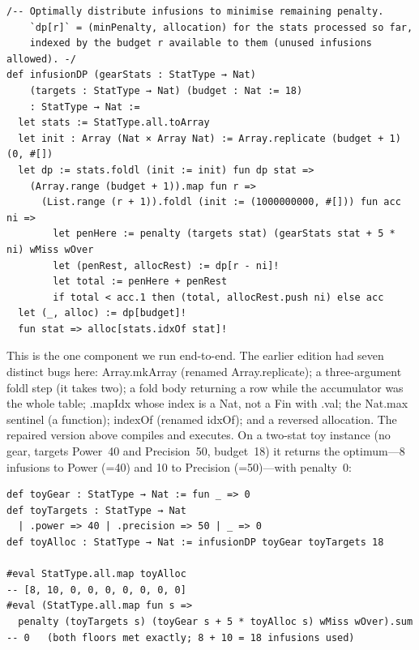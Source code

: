 \documentclass[11pt, a4paper, oneside]{book}
\newcommand{\li}[1]{{\ttfamily\small\color{deepblue}#1}}
\begin{document}
\begin{leanbox}[title={Lean 4 --- Infusion DP (runnable core Lean)}]
\begin{verbatim}
/-- Optimally distribute infusions to minimise remaining penalty.
    `dp[r]` = (minPenalty, allocation) for the stats processed so far,
    indexed by the budget r available to them (unused infusions allowed). -/
def infusionDP (gearStats : StatType → Nat)
    (targets : StatType → Nat) (budget : Nat := 18)
    : StatType → Nat :=
  let stats := StatType.all.toArray
  let init : Array (Nat × Array Nat) := Array.replicate (budget + 1) (0, #[])
  let dp := stats.foldl (init := init) fun dp stat =>
    (Array.range (budget + 1)).map fun r =>
      (List.range (r + 1)).foldl (init := (1000000000, #[])) fun acc ni =>
        let penHere := penalty (targets stat) (gearStats stat + 5 * ni) wMiss wOver
        let (penRest, allocRest) := dp[r - ni]!
        let total := penHere + penRest
        if total < acc.1 then (total, allocRest.push ni) else acc
  let (_, alloc) := dp[budget]!
  fun stat => alloc[stats.idxOf stat]!
\end{verbatim}
\end{leanbox}

This is the one component we run end-to-end.  The earlier edition had seven
distinct bugs here: \li{Array.mkArray} (renamed \li{Array.replicate}); a
three-argument \li{foldl} step (it takes two); a fold body returning a row while
the accumulator was the whole table; \li{.mapIdx} whose index is a \li{Nat}, not
a \li{Fin} with \li{.val}; the \li{Nat.max} sentinel (a function); \li{indexOf}
(renamed \li{idxOf}); and a reversed allocation.  The repaired version above
compiles and executes.  On a two-stat toy instance (no gear, targets
Power~40 and Precision~50, budget~18) it returns the optimum---8 infusions to
Power (=40) and 10 to Precision (=50)---with penalty~0:

\begin{leanbox}[title={Lean 4 --- Running the DP}]
\begin{verbatim}
def toyGear : StatType → Nat := fun _ => 0
def toyTargets : StatType → Nat
  | .power => 40 | .precision => 50 | _ => 0
def toyAlloc : StatType → Nat := infusionDP toyGear toyTargets 18

#eval StatType.all.map toyAlloc
-- [8, 10, 0, 0, 0, 0, 0, 0, 0]
#eval (StatType.all.map fun s =>
  penalty (toyTargets s) (toyGear s + 5 * toyAlloc s) wMiss wOver).sum
-- 0   (both floors met exactly; 8 + 10 = 18 infusions used)
\end{verbatim}
\end{leanbox}
\end{document}
